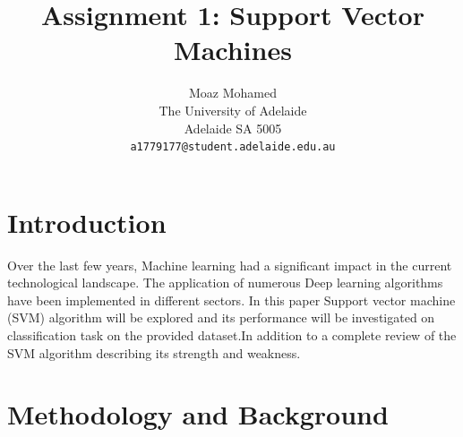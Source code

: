 \documentclass[10pt,twocolumn,letterpaper]{article}
\begin{document}
\title{Assignment 1: Support Vector Machines}

\author{Moaz Mohamed\\
The University of Adelaide\\
Adelaide SA 5005\\
{\tt\small a1779177@student.adelaide.edu.au}

}

\maketitle


\section{Introduction}

Over the last few years, Machine learning had a significant impact in the current technological landscape. 
The application of numerous Deep learning algorithms have been implemented in different sectors. In this paper Support vector machine (SVM) algorithm will be explored and its performance will be investigated on classification task on the provided dataset.In addition to a complete review of the SVM algorithm describing its strength and weakness.
\section{Methodology and Background}
\end{document}
